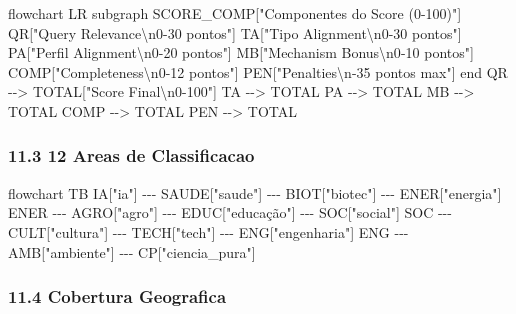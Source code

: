 \documentclass[
  12pt,
]{article}
\newenvironment{Shaded}{}{}
\newcommand{\NormalTok}[1]{#1}
\begin{document}
\begin{Shaded}
\begin{Highlighting}[]
\NormalTok{flowchart LR}
\NormalTok{subgraph SCORE\_COMP["Componentes do Score (0{-}100)"]}
\NormalTok{QR["Query Relevance\textbackslash{}n0{-}30 pontos"]}
\NormalTok{TA["Tipo Alignment\textbackslash{}n0{-}30 pontos"]}
\NormalTok{PA["Perfil Alignment\textbackslash{}n0{-}20 pontos"]}
\NormalTok{MB["Mechanism Bonus\textbackslash{}n0{-}10 pontos"]}
\NormalTok{COMP["Completeness\textbackslash{}n0{-}12 pontos"]}
\NormalTok{PEN["Penalties\textbackslash{}n{-}35 pontos max"]}
\NormalTok{end}
\NormalTok{QR {-}{-}\textgreater{} TOTAL["Score Final\textbackslash{}n0{-}100"]}
\NormalTok{TA {-}{-}\textgreater{} TOTAL}
\NormalTok{PA {-}{-}\textgreater{} TOTAL}
\NormalTok{MB {-}{-}\textgreater{} TOTAL}
\NormalTok{COMP {-}{-}\textgreater{} TOTAL}
\NormalTok{PEN {-}{-}\textgreater{} TOTAL}
\end{Highlighting}
\end{Shaded}

\subsubsection{11.3 12 Areas de
Classificacao}\label{areas-de-classificacao}

\begin{Shaded}
\begin{Highlighting}[]
\NormalTok{flowchart TB}
\NormalTok{IA["ia"] {-}{-}{-} SAUDE["saude"] {-}{-}{-} BIOT["biotec"] {-}{-}{-} ENER["energia"]}
\NormalTok{ENER {-}{-}{-} AGRO["agro"] {-}{-}{-} EDUC["educação"] {-}{-}{-} SOC["social"]}
\NormalTok{SOC {-}{-}{-} CULT["cultura"] {-}{-}{-} TECH["tech"] {-}{-}{-} ENG["engenharia"]}
\NormalTok{ENG {-}{-}{-} AMB["ambiente"] {-}{-}{-} CP["ciencia\_pura"]}
\end{Highlighting}
\end{Shaded}

\subsubsection{11.4 Cobertura Geografica}\label{cobertura-geografica}
\end{document}
